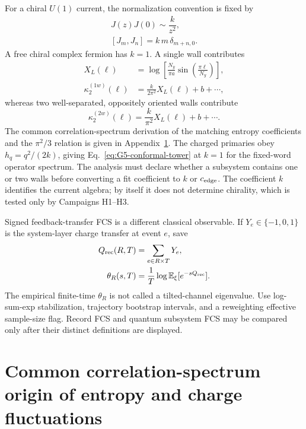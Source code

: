 \documentclass[aps,prx,twocolumn,floatfix,nofootinbib,superscriptaddress,longbibliography]{revtex4-2}
\newcommand{\E}{\mathbb{E}}
\begin{document}
For a chiral $U(1)$ current, the normalization convention is fixed by
\begin{equation}
 \begin{gathered}
 J(z)J(0)\sim\dfrac{k}{z^2},\\
 [J_m,J_n]=k\,m\,\delta_{m+n,0}.
 \end{gathered}
\end{equation}
A free chiral complex fermion has $k=1$.  A single wall contributes
\begin{equation}
 \begin{aligned}
 X_L(\ell)&=\log\!\left[\frac{N_y}{\pi a}
 \sin\!\left(\frac{\pi\ell}{N_y}\right)\right],\\
 \kappa_2^{(1w)}(\ell)&=\frac{k}{2\pi^2}X_L(\ell)+b+\cdots,
 \end{aligned}
\end{equation}
whereas two well-separated, oppositely oriented walls contribute
\begin{equation}
 \kappa_2^{(2w)}(\ell)=\frac{k}{\pi^2}X_L(\ell)+b+\cdots.
\end{equation}
The common correlation-spectrum derivation of the matching entropy coefficients and the
$\pi^2/3$ relation is given in Appendix~\ref{app:entropy-charge-spectrum}.
The charged primaries obey $h_q=q^2/(2k)$, giving
Eq.~\eqref{eq:G5-conformal-tower} at $k=1$ for the fixed-word operator spectrum.
The analysis must declare whether a subsystem contains one or two walls before converting a
fit coefficient to $k$ or $c_{\rm edge}$.  The coefficient $k$ identifies the current algebra;
by itself it does not determine chirality, which is tested only by Campaigns H1--H3.

Signed feedback-transfer FCS is a different classical observable.  If $Y_e\in\{-1,0,1\}$
is the system-layer charge transfer at event $e$, save
\begin{equation}
 \begin{aligned}
 Q_{\rm rec}(R,T)&=\sum_{e\in R\times T}Y_e,\\
 \theta_R(s,T)&=\frac1T\log\E_\xi[e^{-sQ_{\rm rec}}].
 \end{aligned}
\end{equation}
The empirical finite-time $\theta_R$ is not called a tilted-channel eigenvalue.  Use
log-sum-exp stabilization, trajectory bootstrap intervals, and a reweighting effective
sample-size flag.  Record FCS and quantum subsystem FCS may be compared only after their
distinct definitions are displayed.

\section{Common correlation-spectrum origin of entropy and charge fluctuations}
\label{app:entropy-charge-spectrum}
\end{document}
